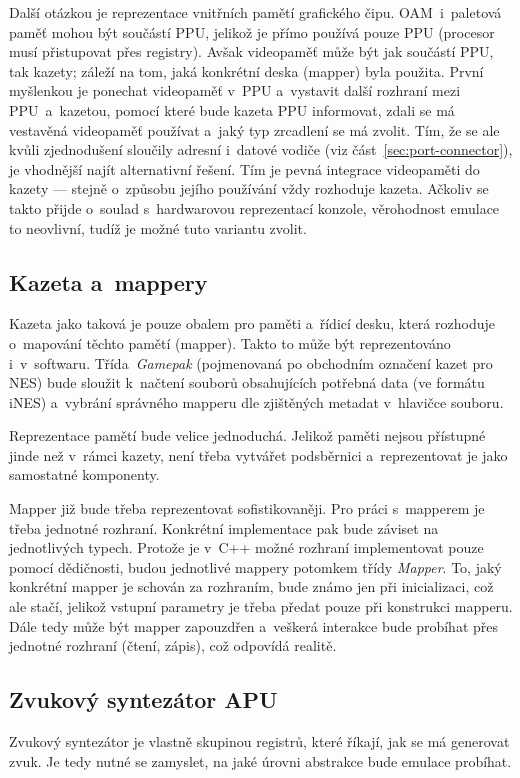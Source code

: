 Další otázkou je reprezentace vnitřních pamětí grafického čipu. OAM~i~paletová paměť mohou být součástí PPU, jelikož je přímo používá pouze PPU (procesor musí přistupovat přes registry). Avšak videopaměť může být jak součástí PPU, tak kazety; záleží na tom, jaká konkrétní deska (mapper) byla použita. První myšlenkou je ponechat videopaměť v~PPU a~vystavit další rozhraní mezi PPU~a~kazetou, pomocí které bude kazeta PPU informovat, zdali se má vestavěná videopaměť používat a~jaký typ zrcadlení se má zvolit. Tím, že se ale kvůli zjednodušení sloučily adresní i~datové vodiče (viz část~\ref{sec:port-connector}), je vhodnější najít alternativní řešení. Tím je pevná integrace videopaměti do kazety --- stejně o~způsobu jejího používání vždy rozhoduje kazeta. Ačkoliv se takto přijde o~soulad s~hardwarovou reprezentací konzole, věrohodnost emulace to neovlivní, tudíž je možné tuto variantu zvolit.

\subsection{Kazeta a~mappery}
Kazeta jako taková je pouze obalem pro paměti a~řídicí desku, která rozhoduje o~mapování těchto pamětí (mapper). Takto to může být reprezentováno i~v~softwaru. Třída~\emph{Gamepak} (pojmenovaná po obchodním označení kazet pro NES) bude sloužit k~načtení souborů obsahujících potřebná data (ve formátu iNES) a~vybrání správného mapperu dle zjištěných metadat v~hlavičce souboru.

Reprezentace pamětí bude velice jednoduchá. Jelikož paměti nejsou přístupné jinde než v~rámci kazety, není třeba vytvářet podsběrnici a~reprezentovat je jako samostatné komponenty. 

Mapper již bude třeba reprezentovat sofistikovaněji. Pro práci s~mapperem je třeba jednotné rozhraní. Konkrétní implementace pak bude záviset na jednotlivých typech. Protože je v~C++ možné rozhraní implementovat pouze pomocí dědičnosti, budou jednotlivé mappery potomkem třídy \emph{Mapper}. To, jaký konkrétní mapper je schován za rozhraním, bude známo jen při inicializaci, což ale stačí, jelikož vstupní parametry je třeba předat pouze při konstrukci mapperu. Dále tedy může být mapper zapouzdřen a~veškerá interakce bude probíhat přes jednotné rozhraní (čtení, zápis), což odpovídá realitě.

\subsection{Zvukový syntezátor APU}
Zvukový syntezátor je vlastně skupinou registrů, které říkají, jak se má generovat zvuk. Je tedy nutné se zamyslet, na jaké úrovni abstrakce bude emulace probíhat.

